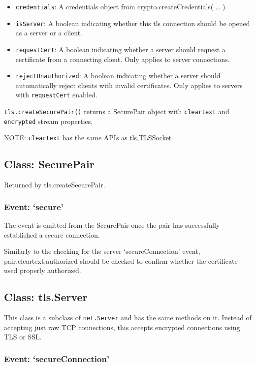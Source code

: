 \begin{itemize}
\item
  \texttt{credentials}: A credentials object from
  crypto.createCredentials( \ldots{} )
\item
  \texttt{isServer}: A boolean indicating whether this tls connection
  should be opened as a server or a client.
\item
  \texttt{requestCert}: A boolean indicating whether a server should
  request a certificate from a connecting client. Only applies to server
  connections.
\item
  \texttt{rejectUnauthorized}: A boolean indicating whether a server
  should automatically reject clients with invalid certificates. Only
  applies to servers with \texttt{requestCert} enabled.
\end{itemize}

\texttt{tls.createSecurePair()} returns a SecurePair object with
\texttt{cleartext} and \texttt{encrypted} stream properties.

NOTE: \texttt{cleartext} has the same APIs as
\hyperref[tls\_class\_tls\_tlssocket]{tls.TLSSocket}

\subsection{Class: SecurePair}

Returned by tls.createSecurePair.

\subsubsection{Event: `secure'}

The event is emitted from the SecurePair once the pair has successfully
established a secure connection.

Similarly to the checking for the server `secureConnection' event,
pair.cleartext.authorized should be checked to confirm whether the
certificate used properly authorized.

\subsection{Class: tls.Server}

This class is a subclass of \texttt{net.Server} and has the same methods
on it. Instead of accepting just raw TCP connections, this accepts
encrypted connections using TLS or SSL.

\subsubsection{Event: `secureConnection'}


